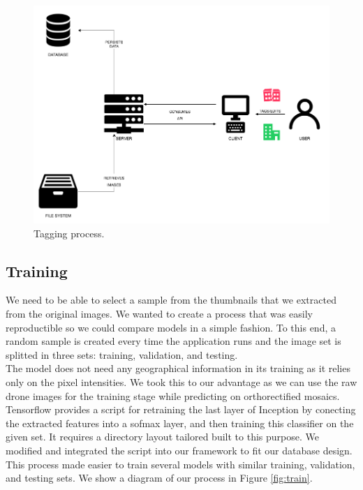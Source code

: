 \begin{figure}[!h]
  \centering
  \includegraphics[width=1\textwidth]{images/tag-diagram.png}
  \caption{Tagging process.}
  \label{fig:tag}
\end{figure}


\subsection{Training}

We need to be able to select a sample from the thumbnails that we extracted from the original images. We wanted to create a process that was easily reproductible so we could compare models in a simple fashion. To this end, a random sample is created every time the application runs and the image set is splitted in three sets: training, validation, and testing.\\

The model does not need any geographical information in its training as it relies only on the pixel intensities. We took this to our advantage as we can use the raw drone images for the training stage while predicting on orthorectified mosaics. Tensorflow provides a script for retraining the last layer of Inception by conecting the extracted features into a sofmax layer, and then training this classifier on the given set. It requires a directory layout tailored built to this purpose. We modified and integrated the script into our framework to fit our database design. This process made easier to train several models with similar training, validation, and testing sets. We show a diagram of our process in Figure \ref{fig:train}.\\


